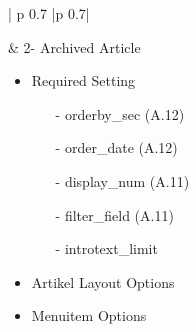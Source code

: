 \begin{minipage}{0.7\textwidth}
\begin{longtable}{| p {0.7\textwidth} |p {0.7\textwidth}|}
\begin{itemize}
\end{itemize}
&
2- Archived Article
\begin{itemize}
	\item Required  Setting 
   		\begin{enumerate}
   		\item[-] orderby\_sec (A.12)
   		\item[-] order\_date (A.12)
   		\item[-] display\_num (A.11) 
   		\item[-] filter\_field (A.11) 
   		\item[-] introtext\_limit 
   		\end{enumerate}
 	\item Artikel Layout Options
	\item Menuitem Options
\end{itemize}
\\ \hline
\end{longtable}
\end{minipage}

